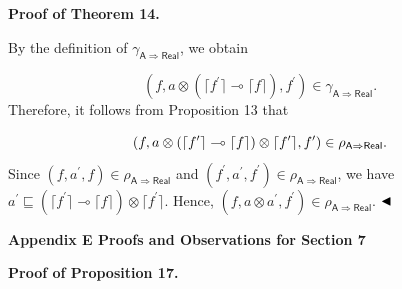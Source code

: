 \documentclass[10pt,a4paper]{amsart}
\begin{document}
 
 
 
\par\medskip\noindent\textbf{Proof of Theorem 14.}\par
 
 
By the definition of $\gamma_{\mathsf{A}\Rightarrow\mathsf{Real}}$, we obtain\par
    \[(f,a\otimes(\lceil f^{\prime}\rceil\multimap\lceil f\rceil),f^{\prime})\in%
\gamma_{\mathsf{A}\Rightarrow\mathsf{Real}}.\]    
Therefore, it follows from Proposition 13 that\par
    \[(f,a\otimes(\lceil f^{\prime}\rceil\multimap\lceil f\rceil)\otimes\lceil f^{%
\prime}\rceil,f^{\prime})\in\rho_{\mathsf{A}\Rightarrow\mathsf{Real}}.\]    
Since $(f,a^{\prime},f)\in\rho_{\mathsf{A}\Rightarrow\mathsf{Real}}$ and $(f^{\prime},a^{\prime},f^{\prime})\in\rho_{\mathsf{A}\Rightarrow\mathsf{Real}}$, we have $a^{\prime}\sqsubseteq(\lceil f^{\prime}\rceil\multimap\lceil f\rceil)\otimes%
\lceil f^{\prime}\rceil$. Hence, $(f,a\otimes a^{\prime},f^{\prime})\in\rho_{\mathsf{A}\Rightarrow\mathsf{Real}}$. $\hfill\blacktriangleleft$\par
 
 
 


 
\par\medskip\noindent\textbf{Appendix E Proofs and Observations for Section 7}\par
 
 
\par\medskip\noindent\textbf{Proof of Proposition 17.}\par
 
 
\end{document}
